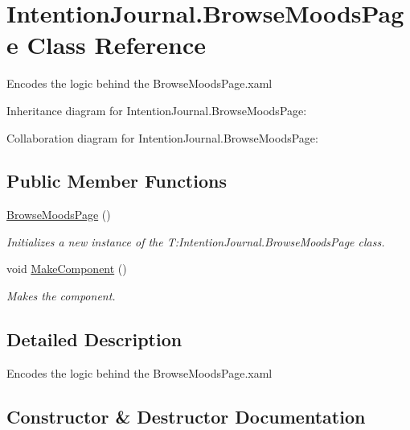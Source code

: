\hypertarget{class_intention_journal_1_1_browse_moods_page}{}\section{Intention\+Journal.\+Browse\+Moods\+Page Class Reference}
\label{class_intention_journal_1_1_browse_moods_page}


Encodes the logic behind the Browse\+Moods\+Page.\+xaml  




Inheritance diagram for Intention\+Journal.\+Browse\+Moods\+Page\+:


Collaboration diagram for Intention\+Journal.\+Browse\+Moods\+Page\+:
\subsection*{Public Member Functions}
\begin{DoxyCompactItemize}
\item 
\hyperlink{class_intention_journal_1_1_browse_moods_page_a6ed523c5d7e55b58f3da3a13d0673e44}{Browse\+Moods\+Page} ()
\begin{DoxyCompactList}\small\item\em Initializes a new instance of the T\+:\+Intention\+Journal.\+Browse\+Moods\+Page class. \end{DoxyCompactList}\item 
void \hyperlink{class_intention_journal_1_1_browse_moods_page_a7cfc209fb5cd012af9bb1473eedb0d81}{Make\+Component} ()
\begin{DoxyCompactList}\small\item\em Makes the component. \end{DoxyCompactList}\end{DoxyCompactItemize}


\subsection{Detailed Description}
Encodes the logic behind the Browse\+Moods\+Page.\+xaml 



\subsection{Constructor \& Destructor Documentation}
\mbox{\label{class_intention_journal_1_1_browse_moods_page_a6ed523c5d7e55b58f3da3a13d0673e44}} 

